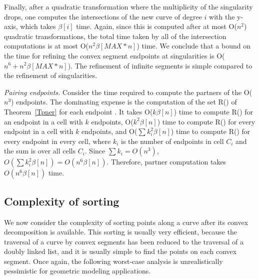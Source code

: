 Finally, after a quadratic transformation where the multiplicity of the singularity 
drops, one computes the intersections of the new curve of degree $i$ with the y-axis, 
which takes $\beta[i]$ time.
Again, since this is computed after at most O($n^{2}$) quadratic transformations,
the total time taken by all of the intersection computations is at most 
O($n^{2} \beta[MAX * n]$) time.
We conclude that a bound on the time for refining the
convex segment endpoints at singularities is O($n^{6} + n^{2} \beta[MAX * n]$).
The refinement of infinite segments is simple compared to the refinement of singularities.

{\em Pairing endpoints.}
%
Consider the time required to compute the partners of the O($n^{3}$) endpoints.
The dominating expense is the computation of the set R(\wo) of 
Theorem~\ref{Tpner} for each endpoint \wo.
It takes O($k\beta[n]$) time to compute R(\wo) for an endpoint in a cell
with $k$ endpoints, O($k^{2}\beta[n]$) time to compute R(\wo) for every 
endpoint in a cell with $k$ endpoints, and O($\sum k_{i}^{2}\beta[n]$)
time to compute R(\wo) for every endpoint in every cell, where $k_{i}$ is the
number of endpoints in cell $C_{i}$ and the sum is over all cells $C_{i}$.
Since $\sum k_{i} = O(n^{3})$, $O(\sum k_{i}^{2}\beta[n]) = O(n^{6}\beta[n])$.
Therefore, partner computation takes $O(n^{6}\beta[n])$ time.
\QED

\subsection{Complexity of sorting}

We now consider the complexity of sorting points along a curve after its convex
decomposition is available.
This sorting is usually very efficient, because the traversal of a curve by
convex segments has been reduced to the traversal of a doubly linked list, and
it is usually simple to find the points on each convex segment.
Once again, the following worst-case analysis is unrealistically pessimistic
for geometric modeling applications.


